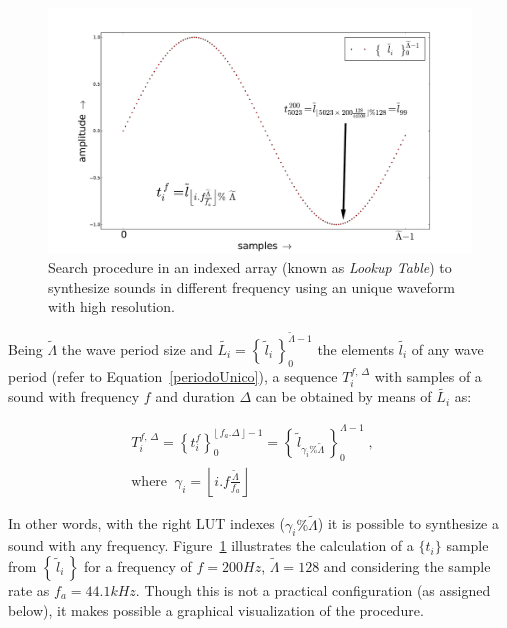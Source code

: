 \documentclass[
 aip,
 jmp,
 amsmath,amssymb,
 reprint,
]{revtex4-1}
\begin{document}
\begin{figure}[h!]
    \centering
        \includegraphics[width=\columnwidth]{figures/lut}
    \caption{Search procedure in an indexed array (known as \emph{Lookup Table}) to synthesize sounds in different frequency using an unique waveform with high resolution.}
        \label{fig:lut}                                                                                                            
\end{figure}

Being $\widetilde{\Lambda}$ the wave period size and $\widetilde{L_i} = \left\{\, \widetilde{l}_i \,\right\}_0^{\widetilde{\Lambda} -1}$ the elements $\widetilde{l_i}$ of any wave period (refer to Equation~\ref{periodoUnico}), a sequence $T_i^{f,\,\Delta}$ with samples of a sound with frequency $f$ and duration $\Delta$ can be obtained by means of $\widetilde{L_i}$ as:

\begin{multline}\label{eq:lut}
T_i^{f,\,\Delta}=\left\{t_i^f\right\}_0^{\lfloor \, f_a . \Delta \, \rfloor -1} = \left\{ \, \widetilde{l}_{\gamma_i \% \widetilde{\Lambda} }\, \right\}_{0}^{\Lambda-1}\; , \quad \\ \text{where} \;\; \gamma_i = \left \lfloor i . f \frac{ \widetilde{\Lambda}}{f_a} \right \rfloor  
\end{multline}

In other words, with the right LUT indexes ($\gamma_i\%\widetilde{\Lambda}$) it is possible to synthesize a sound with any frequency. Figure~\ref{fig:lut} illustrates the calculation of a $\{t_i\}$ sample from $\left\{\,\widetilde{l}_i\,\right\}$ for a frequency of $f=200Hz$, $\widetilde{\Lambda}=128$ and considering the sample rate as $f_a=44.1kHz$.
Though this is not a practical configuration (as assigned below), it makes possible a graphical visualization of the procedure.
\end{document}
